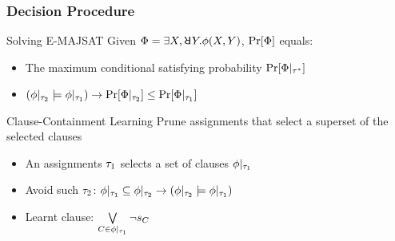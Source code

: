 \begin{frame}
    \frametitle{Decision Procedure}
    \begin{block}{Solving E-MAJSAT}
        Given $\Qf=\exists X,\random{} Y.\pf(X,Y)$, $\Pr[\Phi]$ equals:
        \pause
        \begin{itemize}
            \item The maximum conditional satisfying probability $\Pr[\Phi|_{\tau^*}]$
                  \pause
            \item $(\phi|_{\tau_2}\models\phi|_{\tau_1})\rightarrow\Pr[\Phi|_{\tau_2}]\leq\Pr[\Phi|_{\tau_1}]$
                  \pause
        \end{itemize}
    \end{block}
    \begin{block}{Clause-Containment Learning}
        Prune assignments that select a superset of the selected clauses
        \pause
        \begin{itemize}
            \item An assignments $\tau_1$ selects a set of clauses $\phi|_{\tau_1}$
                  \pause
            \item Avoid such $\tau_2$: $\phi|_{\tau_1}\subseteq\phi|_{\tau_2}\rightarrow(\phi|_{\tau_2}\models\phi|_{\tau_1})$
                  \pause
            \item Learnt clause: $\bigvee\limits_{C\in\phi|_{\tau_1}}\lnot s_{C}$
        \end{itemize}
    \end{block}
\end{frame}

